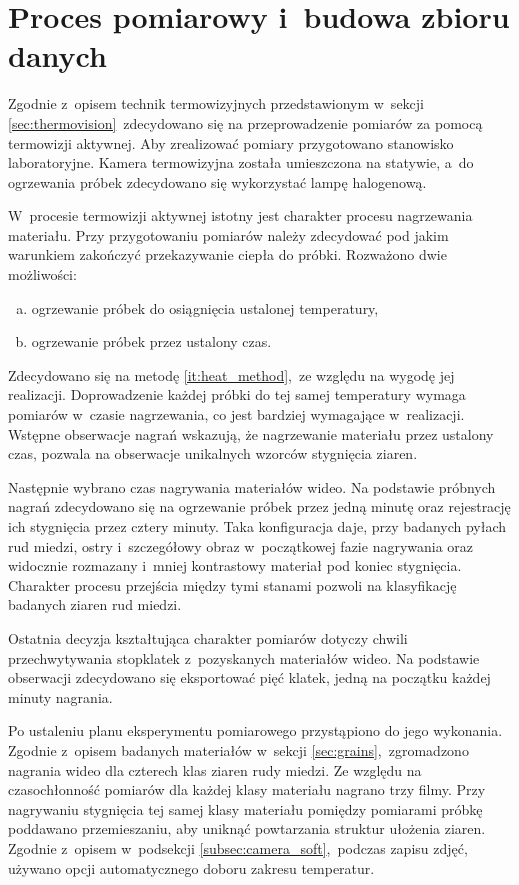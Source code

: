 \section{Proces pomiarowy i~budowa zbioru danych}
\label{sec:measure}
Zgodnie z~opisem technik termowizyjnych przedstawionym w~sekcji
\ref{sec:thermovision}~zdecydowano się na przeprowadzenie pomiarów za pomocą
termowizji aktywnej.
Aby zrealizować pomiary przygotowano stanowisko laboratoryjne.
Kamera termowizyjna została umieszczona na statywie, a~do ogrzewania próbek
zdecydowano się wykorzystać lampę halogenową.

W~procesie termowizji aktywnej istotny jest charakter procesu nagrzewania
materiału.
Przy przygotowaniu pomiarów należy zdecydować pod jakim warunkiem zakończyć
przekazywanie ciepła do próbki.
Rozważono dwie możliwości:
\begin{enumerate}[a)]
    \item ogrzewanie próbek do osiągnięcia ustalonej temperatury,
    \item \label{it:heat_method}
          ogrzewanie próbek przez ustalony czas.
\end{enumerate}
Zdecydowano się na metodę \ref{it:heat_method},~ze względu na wygodę jej
realizacji.
Doprowadzenie każdej próbki do tej samej temperatury wymaga pomiarów w~czasie
nagrzewania, co jest bardziej wymagające w~realizacji.
Wstępne obserwacje nagrań wskazują, że nagrzewanie materiału przez ustalony
czas, pozwala na obserwacje unikalnych wzorców stygnięcia ziaren.

Następnie wybrano czas nagrywania materiałów wideo.
Na podstawie próbnych nagrań zdecydowano się na ogrzewanie próbek przez jedną
minutę oraz rejestrację ich stygnięcia przez cztery minuty.
Taka konfiguracja daje, przy badanych pyłach rud miedzi, ostry i~szczegółowy
obraz w~początkowej fazie nagrywania oraz widocznie rozmazany i~mniej
kontrastowy materiał pod koniec stygnięcia.
Charakter procesu przejścia między tymi stanami pozwoli na klasyfikację badanych
ziaren rud miedzi.

Ostatnia decyzja kształtująca charakter pomiarów dotyczy chwili przechwytywania
stopklatek z~pozyskanych materiałów wideo.
Na podstawie obserwacji zdecydowano się eksportować pięć klatek, jedną na
początku każdej minuty nagrania.

Po ustaleniu planu eksperymentu pomiarowego przystąpiono do jego wykonania.
Zgodnie z~opisem badanych materiałów w~sekcji \ref{sec:grains},~zgromadzono
nagrania wideo dla czterech klas ziaren rudy miedzi.
Ze względu na czasochłonność pomiarów dla każdej klasy materiału nagrano trzy
filmy.
Przy nagrywaniu stygnięcia tej samej klasy materiału pomiędzy pomiarami próbkę
poddawano przemieszaniu, aby uniknąć powtarzania struktur ułożenia ziaren.
Zgodnie z~opisem w~podsekcji \ref{subsec:camera_soft},~podczas zapisu zdjęć,
używano opcji automatycznego doboru zakresu temperatur.

